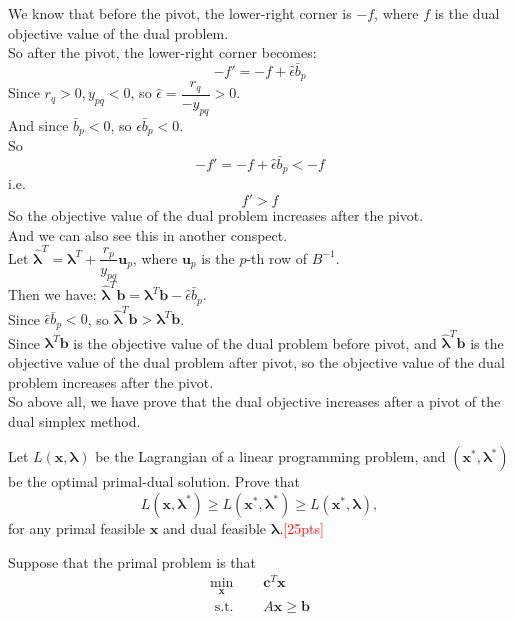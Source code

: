 \documentclass[10pt]{article}
\newenvironment{problem}[2][Problem]{\begin{trivlist}
\item[\hskip \labelsep {\bfseries #1}\hskip \labelsep {\bfseries #2.}]}{\end{trivlist}}
\begin{document}
We know that before the pivot, the lower-right corner is $-f$, where $f$ is the dual objective value of the dual problem.\\
So after the pivot, the lower-right corner becomes:\\
$$-f'=-f+\hat{\epsilon}\bar{b}_p$$
Since $r_q>0,y_{pq}<0$, so $\hat{\epsilon}=\dfrac{r_q}{-y_{pq}}>0$. \\
And since $\bar{b}_p<0$, so $\hat{\epsilon}\bar{b}_p<0$.\\
So
$$-f'= -f +\hat{\epsilon}\bar{b}_p < -f$$
i.e.
$$f'>f$$
So the objective value of the dual problem increases after the pivot.\\
And we can also see this in another conspect.\\
Let $\hat{\bm{\lambda}}^T=\bm{\lambda}^T+\dfrac{r_p}{y_{pq}}\bm{u}_p$, where $\bm{u}_p$ is the $p$-th row of $B^{-1}$.\\
Then we have: $\hat{\bm{\lambda}}^T\bm{b}=\bm{\lambda}^T\bm{b}-\hat{\epsilon}\bar{b}_p$.\\
Since $\hat{\epsilon}\bar{b}_p<0$, so $\hat{\bm{\lambda}}^T\bm{b}>\bm{\lambda}^T\bm{b}$.\\
Since $\bm{\lambda}^T\bm{b}$ is the objective value of the dual problem before pivot, and $\hat{\bm{\lambda}}^T\bm{b}$ is the objective value of the dual problem after pivot, so the objective value of the dual problem increases after the pivot.\\

So above all, we have prove that the dual objective increases after a pivot of the dual simplex method.\\

\newpage


\begin{problem}{3}
    Let $L(\bm{x}, \bm{\lambda})$ be the Lagrangian of a linear programming problem, and $(\bm{x}^*, \bm{\lambda}^*)$ be the optimal primal-dual solution. Prove that $$L(\bm{x}, \bm{\lambda}^*) \geq L(\bm{x}^*, \bm{\lambda}^*) \geq L(\bm{x}^*, \bm{\lambda}),$$ for any primal feasible $\bm{x}$ and dual feasible $\bm{\lambda}$.\textcolor{red}{[25pts]}
\end{problem}

Suppose that the primal problem is that
\begin{equation}
\begin{aligned}
\min_{\bm{x}} \quad & \bm{c}^T\bm{x} \\
\text { s.t. } \quad & A\bm{x} \geq \bm{b} \\
\end{aligned}
\end{equation}
\end{document}
